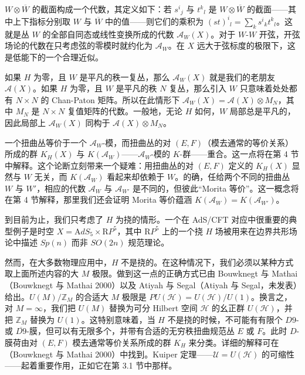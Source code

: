 \(W\otimes \overline W\) 的截面构成一个代数，其定义如下：若 \(s^i{}_j\) 与 \(t^k{}_l\) 是 \(W\otimes \overline W\) 的截面——其中上下指标分别取 \(W\) 与 \(\overline W\) 中的值——则它们的乘积为 \((st)^i{}_l=\sum_ks^i{}_kt^k{}_l\)。这就是丛 \(W\) 的全部自同态或线性变换所成的代数 \({\mathcal A}_W(X)\)。对于 \(W\)-\(W\) 开弦，开弦场论的代数在只考虑弦的零模时就约化为 \({\mathcal A}_W\)。在 \(X\) 远大于弦标度的极限下，这是低能下的一个合理近似。

如果 \(H\) 为零，且 \(W\) 是平凡的秩一复丛，那么 \({\mathcal A}_W(X)\) 就是我们的老朋友 \({\mathcal A}(X)\)。如果 \(H\) 为零，且 \(W\) 是平凡的秩 \(N\) 复丛，那么引入 \(W\) 只意味着处处都有 \(N\times N\) 的 Chan-Paton 矩阵。所以在此情形下 \({\mathcal A}_W(X)={\mathcal A}(X)\otimes M_N\)，其中 \(M_N\) 是 \(N\times N\) 复值矩阵的代数。一般地，无论 \(H\) 如何，\(W\) 局部总是平凡的，因此局部上 \({\mathcal A}_W(X)\) 同构于 \({\mathcal A}(X)\otimes M_N\)。

一个扭曲丛等价于一个 \({\mathcal A}_W\)-模，而扭曲丛的对 \((E,F)\)（模去通常的等价关系）所成的群 \(K_H(X)\) 与 \(K({\mathcal A}_W)\)——\({\mathcal A}_W\)-模的 \(K\)-群——重合。这一点将在第 4 节中解释。这个论断立刻带来一个疑难：用扭曲丛的对 \((E,F)\) 定义的 \(K_H(X)\) 显然与 \(W\) 无关，而 \(K({\mathcal A}_W)\) 看起来却依赖于 \(W\)。的确，任给两个不同的扭曲丛 \(W\) 与 \(W'\)，相应的代数 \({\mathcal A}_W\) 与 \({\mathcal A}_{W'}\) 是不同的，但彼此“Morita 等价”。这一概念将在第 4 节解释，那里我们还会证明 Morita 等价蕴涵 \(K({\mathcal A}_W)=K({\mathcal A}_{W'})\)。

到目前为止，我们只考虑了 \(H\) 为挠的情形。一个在 AdS/CFT 对应中很重要的典型例子是时空 \(X={\mathrm AdS}_5\times {\mathrm RP}^5\)，其中 \({\mathrm RP}^5\) 上的一个挠 \(H\) 场被用来在边界共形场论中描述 \(Sp(n)\) 而非 \(SO(2n)\) 规范理论。

然而，在大多数物理应用中，\(H\) 不是挠的。在这种情况下，我们必须以某种方式取上面所述内容的大 \(M\) 极限。做到这一点的正确方式已由 Bouwknegt 与 Mathai（Bouwknegt 与 Mathai 2000）以及 Atiyah 与 Segal（Atiyah 与 Segal，未发表）给出。\(U(M)/\mathbb{Z}_M\) 的合适大 \(M\) 极限是 \(PU({\mathcal H})=U({\mathcal H})/U(1)\)。换言之，对 \(M=\infty\)，我们把 \(U(M)\) 替换为可分 Hilbert 空间 \({\mathcal H}\) 的幺正群 \(U({\mathcal H})\)，并把 \(\mathbb{Z}_M\) 替换为 \(U(1)\)。这特别意味着，当 \(H\) 不是挠的时候，不可能有有限个 \(D9\)- 或 \(\overline{D9}\)-膜，但可以有无限多个，并带有合适的无穷秩扭曲规范丛 \(E\) 或 \(F\)。此时 \(D\)-膜荷由对 \((E,F)\) 模去通常等价关系所成的群 \(K_H\) 来分类。详细的解释可在（Bouwknegt 与 Mathai 2000）中找到。Kuiper 定理——\({\mathcal U}=U({\mathcal H})\) 的可缩性——起着重要作用，正如它在第 3.1 节中那样。

